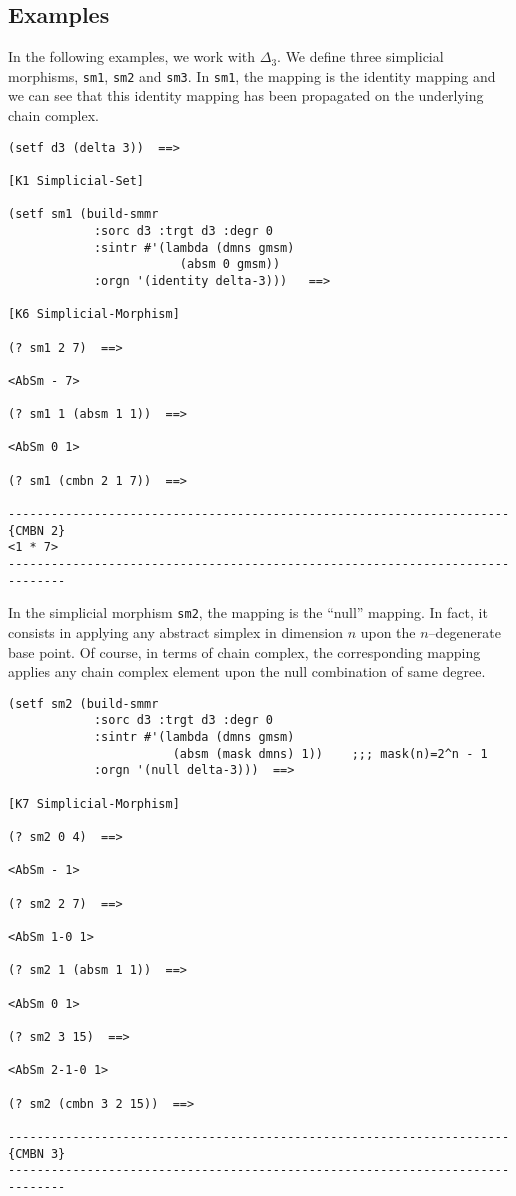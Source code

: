 \subsection* {Examples}

In the following examples, we work with $\Delta_3$. We define three simplicial morphisms, {\tt sm1}, {\tt sm2}
and {\tt sm3}. In {\tt sm1}, the mapping is the identity mapping and we can see that this identity mapping
has been propagated on the underlying chain complex.
{\footnotesize\begin{verbatim}
(setf d3 (delta 3))  ==>

[K1 Simplicial-Set]

(setf sm1 (build-smmr
            :sorc d3 :trgt d3 :degr 0
            :sintr #'(lambda (dmns gmsm)
                        (absm 0 gmsm))
            :orgn '(identity delta-3)))   ==>

[K6 Simplicial-Morphism]

(? sm1 2 7)  ==>

<AbSm - 7>

(? sm1 1 (absm 1 1))  ==>

<AbSm 0 1>

(? sm1 (cmbn 2 1 7))  ==>

----------------------------------------------------------------------{CMBN 2}
<1 * 7>
------------------------------------------------------------------------------
\end{verbatim}}
In the simplicial morphism {\tt sm2}, the mapping is the ``null'' mapping. In
fact, it consists in  applying any abstract simplex in dimension $n$ upon the $n$--degenerate base point. 
Of course, in terms of chain complex, the cor\-res\-pon\-ding mapping applies any chain complex element
upon the null combination of same degree.
{\footnotesize\begin{verbatim}
(setf sm2 (build-smmr
            :sorc d3 :trgt d3 :degr 0
            :sintr #'(lambda (dmns gmsm)
                       (absm (mask dmns) 1))    ;;; mask(n)=2^n - 1 
            :orgn '(null delta-3)))  ==>

[K7 Simplicial-Morphism]

(? sm2 0 4)  ==>

<AbSm - 1>

(? sm2 2 7)  ==>

<AbSm 1-0 1>

(? sm2 1 (absm 1 1))  ==>

<AbSm 0 1>

(? sm2 3 15)  ==>

<AbSm 2-1-0 1>

(? sm2 (cmbn 3 2 15))  ==>

----------------------------------------------------------------------{CMBN 3}
------------------------------------------------------------------------------
\end{verbatim}}
